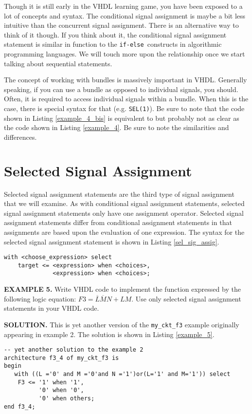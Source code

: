 Though it is still early in the VHDL learning game, you have been exposed to a lot of concepts and syntax. The conditional signal assignment is maybe a bit less intuitive than the concurrent signal assignment. There is an alternative way to think of it though. If you think about it, the conditional signal assignment statement is similar in function to the \texttt{if-else }constructs in algorithmic programming languages. We will touch more upon the relationship once we start talking about sequential statements.

The concept of working with bundles is massively important in VHDL. Generally speaking, if you can use a bundle as opposed to individual signals, you should. Often, it is required to access individual signals within a bundle. When this is the case, there is special syntax for that (e.g. \texttt{SEL(1)}). Be sure to note that the code shown in Listing \ref{example_4_bis} is equivalent to but probably not as clear as the code shown in Listing \ref{example_4}. Be sure to note the similarities and differences.

\section{Selected Signal Assignment}
Selected signal assignment statements are the third type of signal assignment that we will examine. As with conditional signal assignment statements, selected signal assignment statements only have one assignment operator. Selected signal assignment statements differ from conditional assignment statements in that assignments are based upon the evaluation of one expression. The syntax for the selected signal assignment statement is shown in Listing \ref{sel_sig_assig}.
\begin{lstlisting}[label=sel_sig_assig, caption=Syntax for the selected signal assignment statement.]
with <choose_expression> select
	target <= <expression> when <choices>,
	          <expression> when <choices>;
\end{lstlisting}

\begin{leftbar}
\noindent
\textbf{EXAMPLE 5.}
Write VHDL code to implement the function expressed by the following logic equation: $F3=\overline{L}\overline{M}N+LM$. Use only selected signal assignment statements in your VHDL code.
\end{leftbar}
\noindent
\textbf{SOLUTION.} This is yet another version of the \texttt{my\_ckt\_f3} example originally appearing in example 2. The solution is shown in Listing \ref{example_5}.
\begin{lstlisting}[label=example_5, caption=Solution of example 5.]
-- yet another solution to the example 2
architecture f3_4 of my_ckt_f3 is
begin
   with ((L ='0' and M ='0'and N ='1')or(L='1' and M='1')) select
	F3 <= '1' when '1',
	      '0' when '0',
	      '0' when others;
end f3_4;
\end{lstlisting}

